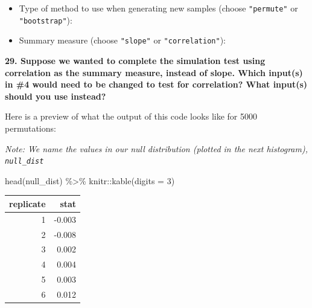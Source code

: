 \documentclass[
  letterpaper,
  DIV=11,
  numbers=noendperiod]{scrartcl}
\newenvironment{Shaded}{\begin{snugshade}}{\end{snugshade}}
\newcommand{\AttributeTok}[1]{\textcolor[rgb]{0.40,0.45,0.13}{#1}}
\newcommand{\DecValTok}[1]{\textcolor[rgb]{0.68,0.00,0.00}{#1}}
\newcommand{\FunctionTok}[1]{\textcolor[rgb]{0.28,0.35,0.67}{#1}}
\newcommand{\NormalTok}[1]{\textcolor[rgb]{0.00,0.23,0.31}{#1}}
\newcommand{\SpecialCharTok}[1]{\textcolor[rgb]{0.37,0.37,0.37}{#1}}
\providecommand{\tightlist}{%
  \setlength{\itemsep}{0pt}\setlength{\parskip}{0pt}}\usepackage{longtable,booktabs,array}
\begin{document}
\vspace{.2in}

\begin{itemize}
\tightlist
\item
  Type of method to use when generating new samples (choose
  \texttt{"permute"} or \texttt{"bootstrap"}): 
\end{itemize}

\vspace{0.2cm}

\begin{itemize}
\tightlist
\item
  Summary measure (choose \texttt{"slope"} or \texttt{"correlation"}):
\end{itemize}

\vspace{0.2in}

\textbf{29. Suppose we wanted to complete the simulation test using
correlation as the summary measure, instead of slope. Which input(s) in
\#4 would need to be changed to test for correlation? What input(s)
should you use instead?}


\vspace{0.5cm}

Here is a preview of what the output of this code looks like for 5000
permutations:

\emph{Note: We name the values in our null distribution (plotted in the
next histogram), \texttt{null\_dist}}

\begin{Shaded}
\begin{Highlighting}[]
\FunctionTok{head}\NormalTok{(null\_dist) }\SpecialCharTok{\%\textgreater{}\%}\NormalTok{ knitr}\SpecialCharTok{::}\FunctionTok{kable}\NormalTok{(}\AttributeTok{digits =} \DecValTok{3}\NormalTok{)}
\end{Highlighting}
\end{Shaded}

\begin{longtable}[]{@{}rr@{}}
\toprule()
replicate & stat \\
\midrule()
\endhead
1 & -0.003 \\
2 & -0.008 \\
3 & 0.002 \\
4 & 0.004 \\
5 & 0.003 \\
6 & 0.012 \\
\bottomrule()
\end{longtable}
\end{document}
